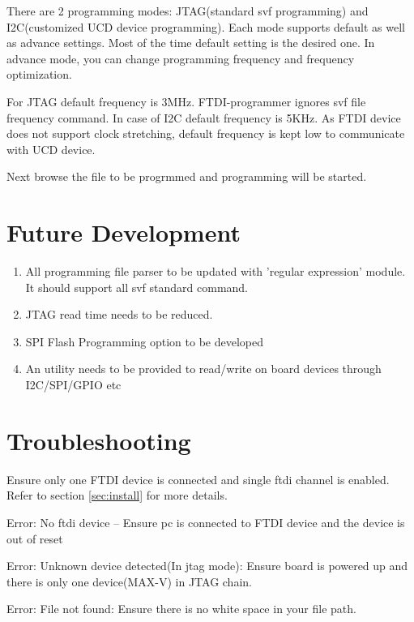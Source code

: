 \documentclass[a4paper,12pt]{report}%
\begin{document}
	There are 2 programming modes: JTAG(standard svf programming) and I2C(customized UCD device programming). Each mode 
	supports default as well as advance settings. Most of the time default setting is the desired one. In advance mode, you
	can change programming frequency and frequency optimization. 
	
	For JTAG default frequency is 3MHz. FTDI-programmer ignores svf file frequency command. In case of I2C default frequency
	is 5KHz. As FTDI device does not support clock stretching, default frequency is kept low to communicate with UCD device.
	
	Next browse the file to be progrmmed and programming will be started.  	
		
		
		
\section{Future Development}
\begin{enumerate}
	\item 
	All programming file parser to be updated with 'regular expression' module. It should support all svf standard command.
	
	\item 
	JTAG read time needs to be reduced.
	
	\item 
	SPI Flash Programming option to be developed
	
	\item 
	An utility needs to be provided to read/write on board devices through I2C/SPI/GPIO etc

\end{enumerate}

\section{Troubleshooting}
Ensure only one FTDI device is connected and single ftdi channel is enabled. Refer to section \ref{sec:install} for more details.

Error: No ftdi device	-- Ensure pc is connected to FTDI device and the device is out of reset


Error: Unknown device detected(In jtag mode): Ensure board is powered up and there is only one device(MAX-V) in JTAG chain.

Error: File not found: Ensure there is no white space in your file path.
\end{document}
